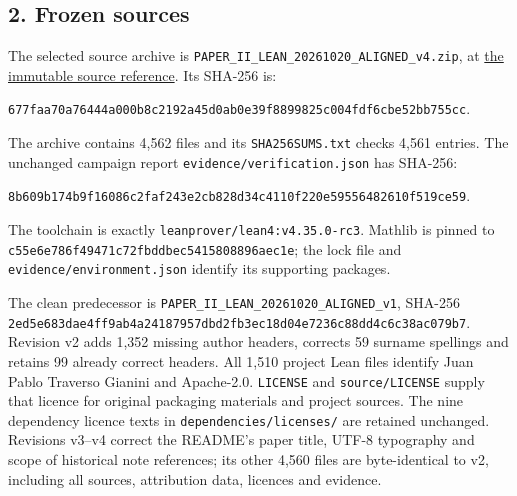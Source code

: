 \documentclass[english,11pt,a4paper]{article}
\begin{document}
\subsection{2. Frozen sources}\label{frozen-sources}

The selected source archive is \texttt{PAPER\_\allowbreak{}II\_\allowbreak{}LEA\allowbreak{}N\_\allowbreak{}20261020\_\allowbreak{}A\allowbreak{}LIGNED\_\allowbreak{}v4.\allowbreak{}zi\allowbreak{}p}, at \href{https://github.com/jtraverso/nash-williams-triangle-decompositions-release/blob/d6d020982ebf3f3cd8c104b6befc6c094850b3e7/archives/PAPER_II_LEAN_20261020_ALIGNED_v4.zip}{the immutable source reference}. Its SHA-256 is:

\texttt{677faa70\allowbreak{}a764\allowbreak{}44a0\allowbreak{}00b8c219\allowbreak{}\allowbreak{}2a45d0ab\allowbreak{}0e39\allowbreak{}f889\allowbreak{}9825c004\allowbreak{}\allowbreak{}fdf6cbe5\allowbreak{}2bb7\allowbreak{}55cc\allowbreak{}}.

The archive contains 4,562 files and its \texttt{SHA256SUMS.\allowbreak{}t\allowbreak{}xt} checks 4,561 entries. The unchanged campaign report \texttt{evidence/\allowbreak{}ver\allowbreak{}ification.\allowbreak{}js\allowbreak{}on} has SHA-256:

\texttt{8b609b17\allowbreak{}4b9f\allowbreak{}1608\allowbreak{}6c2faf24\allowbreak{}\allowbreak{}3e2cb828\allowbreak{}d34c\allowbreak{}4110\allowbreak{}f220e595\allowbreak{}\allowbreak{}56482610\allowbreak{}f519\allowbreak{}ce59\allowbreak{}}.

The toolchain is exactly \texttt{leanprover/\allowbreak{}l\allowbreak{}ean4:v4.\allowbreak{}35.\allowbreak{}0\allowbreak{}-\allowbreak{}rc3}. Mathlib is pinned to \texttt{c55e6e78\allowbreak{}6f49\allowbreak{}471c\allowbreak{}72fbddbe\allowbreak{}\allowbreak{}c5415808\allowbreak{}896a\allowbreak{}ec1e\allowbreak{}}; the lock file and \texttt{evidence/\allowbreak{}env\allowbreak{}ironment.\allowbreak{}jso\allowbreak{}n} identify its supporting packages.

The clean predecessor is \texttt{PAPER\_\allowbreak{}II\_\allowbreak{}LEA\allowbreak{}N\_\allowbreak{}20261020\_\allowbreak{}A\allowbreak{}LIGNED\_\allowbreak{}v1}, SHA-256 \texttt{2ed5e683\allowbreak{}dae4\allowbreak{}ff9a\allowbreak{}b4a24187\allowbreak{}\allowbreak{}957dbd2f\allowbreak{}b3ec\allowbreak{}18d0\allowbreak{}4e7236c8\allowbreak{}\allowbreak{}8dd4c6c3\allowbreak{}8ac0\allowbreak{}79b7\allowbreak{}}. Revision v2 adds 1,352 missing author headers, corrects 59 surname spellings and retains 99 already correct headers. All 1,510 project Lean files identify Juan Pablo Traverso Gianini and Apache-2.0. \texttt{LICENSE} and \texttt{source/\allowbreak{}LICEN\allowbreak{}SE} supply that licence for original packaging materials and project sources. The nine dependency licence texts in \texttt{dependencies\allowbreak{}/\allowbreak{}licenses/\allowbreak{}} are retained unchanged. Revisions v3--v4 correct the README's paper title, UTF-8 typography and scope of historical note references; its other 4,560 files are byte-identical to v2, including all sources, attribution data, licences and evidence.
\end{document}
